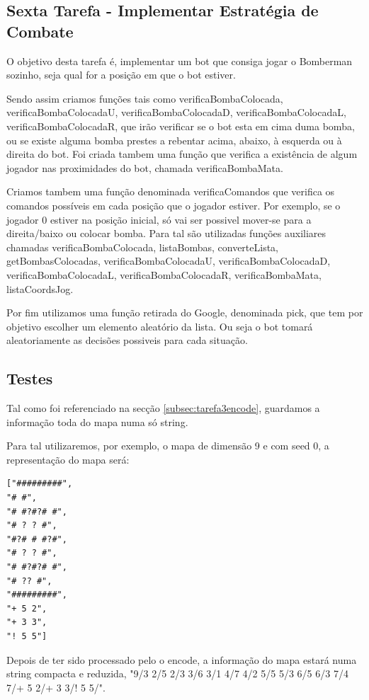 \documentclass[a4paper]{article}
\begin{document}
\subsection{Sexta Tarefa - Implementar Estratégia de Combate}
\label{subsec:tarefa6sol}

O objetivo desta tarefa é, implementar um bot que consiga jogar o Bomberman sozinho, seja qual for
a posição em que o bot estiver.

Sendo assim criamos funções tais como verificaBombaColocada, verificaBombaColocadaU, verificaBombaColocadaD, verificaBombaColocadaL, verificaBombaColocadaR, que irão verificar se o bot esta em cima duma bomba, ou se existe alguma bomba prestes a rebentar acima, abaixo, à esquerda ou à direita do bot. Foi criada tambem uma função que verifica a existência de algum jogador nas proximidades do bot, chamada verificaBombaMata.

Criamos tambem uma função denominada verificaComandos que verifica os comandos possíveis em cada posição que o jogador estiver. Por exemplo, se o jogador 0 estiver na posição inicial, só vai ser possivel mover-se para a direita/baixo ou colocar bomba. Para tal são utilizadas funções auxiliares chamadas verificaBombaColocada, listaBombas, converteLista, getBombasColocadas, verificaBombaColocadaU, verificaBombaColocadaD, verificaBombaColocadaL, verificaBombaColocadaR, verificaBombaMata, listaCoordsJog.

Por fim utilizamos uma função retirada do Google, denominada pick, que tem por objetivo escolher um elemento aleatório da lista. Ou seja o bot tomará aleatoriamente as decisões possiveis para cada situação.

\subsection{Testes}

Tal como foi referenciado na secção \ref{subsec:tarefa3encode}, guardamos a informação toda do mapa numa só string.

Para tal utilizaremos, por exemplo, o mapa de dimensão 9 e com seed 0, a representação do mapa será:
\begin{verbatim}
["#########",
"# #",
"# #?#?# #",
"# ? ? #",
"#?# # #?#",
"# ? ? #",
"# #?#?# #",
"# ?? #",
"#########",
"+ 5 2",
"+ 3 3",
"! 5 5"]
\end{verbatim}

Depois de ter sido processado pelo o encode, a informação do mapa estará numa string compacta e reduzida, "9/3 2/5 2/3 3/6 3/1 4/7 4/2 5/5 5/3 6/5 6/3 7/4 7/+ 5 2/+ 3 3/! 5 5/".
\end{document}
